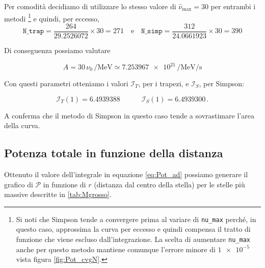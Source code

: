 \documentclass[a4paper, titlepage]{article}
\begin{document}
Per comodità decidiamo di utilizzare lo stesso valore di $\hat \nu_\text{max} = 30$ per entrambi i metodi 
\footnote{Si noti che Simpson tende a convergere prima al variare di \texttt{nu\_max} perché, in questo caso, approssima la curva per eccesso e quindi compensa il tratto di funzione che viene escluso dall'integrazione.
La scelta di aumentare \texttt{nu\_max} anche per questo metodo mantiene comunque l'errore minore di $\num{1e-5}$ vista figura \ref{fig:Pot_cvgN}.}
e quindi, per eccesso, 
\begin{equation}
    \texttt{N\_trap} = \frac{264}{29.2526072} \times 30 = 271
    \quad \text{e} \quad
    \texttt{N\_simp} = \frac{312}{24.0661923} \times 30 = 390
\end{equation}

Di conseguenza possiamo valutare

\begin{equation}
    A = 30 \, \nu_0 \, \unit{\per\mega\electronvolt} \simeq \num{7.253967e21} \, \unit{\per\mega\electronvolt\per\second}
    \label{eq:A_giusto}
\end{equation}

Con questi parametri otteniamo i valori $\mathcal I_T$, per i trapezi, e $\mathcal I_S$, per Simpson:

\begin{equation}
    \mathcal I_T (1) = 6.4939388
    \quad \quad \quad
    \mathcal I_S (1) = 6.4939300 \, .
    \label{eq:val_I}
\end{equation}

A conferma che il metodo di Simpson in questo caso tende a sovrastimare l'area della curva.


\subsection{Potenza totale in funzione della distanza}

Ottenuto il valore dell'integrale in equazione \ref{eq:Pot_ad} possiamo generare il grafico di $\mathcal{P}$ in funzione di $r$ (distanza dal centro della stella) per le stelle più massive descritte in \ref{tab:Mgrosso}.
\end{document}
